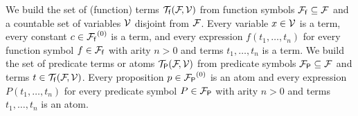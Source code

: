 
\begin{definition}
	We build the set of (function) {\myem terms} ${{\mathcal T}_{\mathsf f}({\mathcal F}\!,{\mathcal V})}$ 
	from function symbols ${{\mathcal F}_{\mathsf f}} \subseteq {\mathcal F}$ and 
	a countable set of {\myem variables} ${\mathcal V}$ disjoint from ${\mathcal F}$.
	Every variable $x\in{\mathcal V}$ is a term,
	every constant $c\in{{\mathcal F}_{\mathsf f}}^{(0)}$ is a term, 
	and every expression $f(t_1,\ldots,t_n)$
	for every function symbol $f\in{{\mathcal F}_{\mathsf f}}$ 
	with arity $n>0$ 
	and terms $t_1,\ldots,t_n$
	is a term.
%	
	We build the set of predicate terms or {\myem atoms} ${{\mathcal T}_{\mathsf P}({\mathcal F}\!,{\mathcal V})}$
	from predicate symbols ${{\mathcal F}_{\mathsf P}} \subseteq {\mathcal F}$ and terms $t\in{{\mathcal T}_{\mathsf f}({\mathcal F}\!,{\mathcal V})}$. 
	Every proposition $p\in{{\mathcal F}_{\mathsf P}}^{(0)}$ is an atom 
	and every expression $P(t_1,\ldots,t_n)$
	for every predicate symbol $P\in{{\mathcal F}_{\mathsf P}}$ with arity $n>0$ and terms $t_1,\ldots,t_n$ is an atom.
%
\end{definition}

